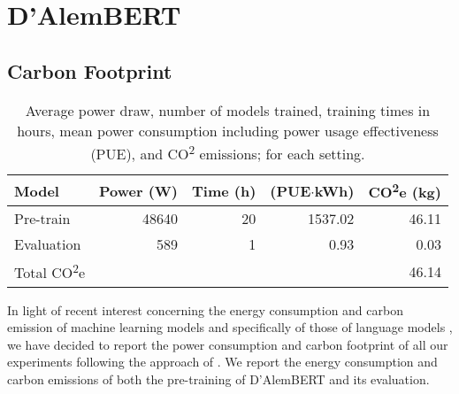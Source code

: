 \chapter{D'AlemBERT}

\section{Carbon Footprint}\label{carbon-footprint-dalembert}

\begin{table}[th]
    \centering\small
        \begin{tabular}{lrrrr}
            \toprule
            \textbf{Model}               & {\textbf{Power (W)}} & {\textbf{Time (h)}} & {\textbf{(PUE$\cdotp$kWh)}} & {\textbf{CO\textsuperscript{2}e (kg)}} \\
            \midrule
            Pre-train                    & 48640                & 20                  & 1537.02                     & 46.11                                  \\
            Evaluation                   & 589                  & 1                   & 0.93                        & 0.03                                   \\
            \midrule
            Total CO\textsuperscript{2}e &                      &                     &                             & 46.14                                  \\
            \bottomrule
        \end{tabular}
    \caption{Average power draw, number of models trained, training times in hours, mean power consumption including power usage effectiveness (PUE), and CO\textsuperscript{2} emissions; for each setting.}
    \label{tab:carbon-dalembert}
\end{table}

In light of recent interest concerning the energy consumption and carbon emission of machine learning models and specifically of those of language models \cite{schwartz-etal-2020-green,bender-etal-2021-on}, we have decided to report the power consumption and carbon footprint of all our experiments following the approach of . We report the energy consumption and carbon emissions of both the pre-training of D'AlemBERT and its evaluation.

